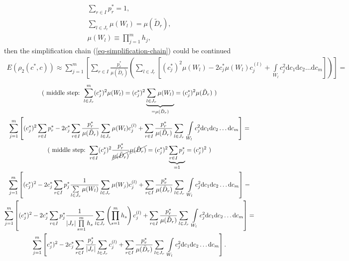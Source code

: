 \begin{gather}
\sum\limits_{r \in I} p_{r}^{*} =1, \\
\sum\limits_{l \in J_{r}} \mu(W_{l}) =\mu(\tilde{D}_{r}), \\
\mu(W_{l}) \equiv \prod\limits_{j=1}^{m}h_{j},
\end{gather}
then the simplification chain (\ref{eq-simplification-chain}) could be continued
\begin{gather}
\nonumber
E(\rho_{2}(c^{*},c)) \approx \sum\limits_{j=1}^{m}  \left[ \sum\limits_{r \in I} \frac{p_{r}^{*}}{\mu(\tilde{D}_{r})} \left( \sum\limits_{l \in J_{r}} \left[ (c_{j}^{*})^{2} \mu(W_{l}) - 2c_{j}^{*} \mu(W_{l}) c_{j}^{(l)} + \int\limits_{W_{l}} c_{j}^{2} \mathrm{d}c_{1} \mathrm{d}c_{2} \dots \mathrm{d}c_{m} \right] \right) \right] = 
\end{gather}
\begin{gather}
\nonumber
\text{( middle step: } \sum_{l \in J_{r}}^{m}(c_{j}^{*})^{2} \mu(W_{l}) = (c_{j}^{*})^{2} \underbrace{\sum_{l \in J_{r}} \mu(W_{l})}_{=\mu(\tilde{D}_{r})} = (c_{j}^{*})^{2} \mu(\tilde{D}_{r}) \text{ )} \\
\nonumber
\sum\limits_{j=1}^{m} \left[  (c_{j}^{*})^{2}  \sum\limits_{r \in I} p_{r}^{*}  - 2c_{j}^{*}  \sum\limits_{r \in I} \frac{p_{r}^{*}}{\mu(\tilde{D}_{r})} \sum\limits_{l \in J_{r}} \mu(W_{l})  c_{j}^{(l)}  + \sum\limits_{r \in I} \frac{p_{r}^{*}}{\mu(\tilde{D}_{r})} \sum\limits_{l \in J_{r}} \ \int\limits_{W_{l}} c_{j}^{2}  \mathrm{d}c_{1} \mathrm{d}c_{2} \dots \mathrm{d}c_{m} \right] = \\
\nonumber
\text{( middle step: } \sum_{r \in I} (c_{j}^{*})^{2} \frac{p_{r}^{*}}{\cancel{\mu(\tilde{D}_{r})}} \cancel{\mu(\tilde{D}_{r})} = (c_{j}^{*})^{2} \underbrace{\sum_{r \in I} p_{j}^{*}}_{=1} = (c_{j}^{*})^{2} \text{ )}\\
\nonumber
\sum\limits_{j=1}^{m} \left[  (c_{j}^{*})^{2} - 2c_{j}^{*} \sum\limits_{r \in I} p_{j}^{*} \frac{1}{\sum\limits_{l \in J_{r}} \mu(W_{l})} \sum\limits_{l \in J_{r}} \mu(W_{j}) c_{j}^{(l)} +  \sum\limits_{r \in I} \frac{p_{r}^{*}}{\mu(\tilde{D}_{r})} \sum\limits_{l \in J_{r}} \ \int\limits_{W_{l}} c_{j}^{2}  \mathrm{d}c_{1} \mathrm{d}c_{2} \dots \mathrm{d}c_{m} \right] = \\
\nonumber
\sum\limits_{j=1}^{m}  \left[    (c_{j}^{*})^{2} - 2c_{j}^{*} \sum\limits_{r \in I} p_{j}^{*} \frac{1}{\left| J_{r} \right| \prod\limits_{s=1}^{m} h_{s}} \sum\limits_{l \in J_{r}} \left( \prod_{s=1}^{m} h_{s} \right) c_{j}^{(l)} +  \sum\limits_{r \in I} \frac{p_{r}^{*}}{\mu(\tilde{D}_{r})} \sum\limits_{l \in J_{r}} \ \int\limits_{W_{l}} c_{j}^{2}  \mathrm{d}c_{1} \mathrm{d}c_{2} \dots \mathrm{d}c_{m} \right] = \\
\sum\limits_{j=1}^{m} \left[ c_{j}^{*})^{2} - 2c_{j}^{*} \sum\limits_{r \in I} \frac{p_{j}^{*}}{ \left| J_{r} \right|} \sum\limits_{l \in J_{r}} c_{j}^{(l)} + \sum\limits_{r \in I} \frac{p_{r}^{*}}{\mu(\tilde{D}_{r})} \sum\limits_{l \in J_{r}} \ \int\limits_{W_{l}} c_{j}^{2}  \mathrm{d}c_{1} \mathrm{d}c_{2} \dots \mathrm{d}c_{m} \right]. \label{eq-final-simplification}
\end{gather}
